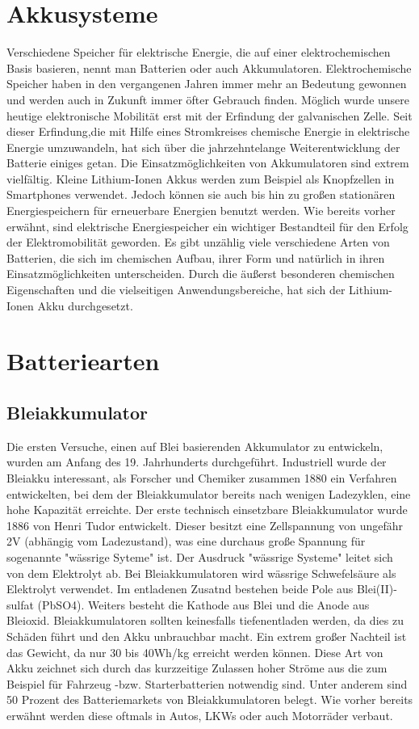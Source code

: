 \section{Akkusysteme}
Verschiedene Speicher für elektrische Energie, die auf einer elektrochemischen Basis basieren, nennt man Batterien oder auch Akkumulatoren. Elektrochemische Speicher haben in den vergangenen Jahren immer mehr an Bedeutung gewonnen und werden auch in Zukunft immer öfter Gebrauch finden. Möglich wurde unsere heutige elektronische Mobilität erst mit der Erfindung der galvanischen Zelle. Seit dieser Erfindung,die mit Hilfe eines Stromkreises chemische Energie in elektrische Energie umzuwandeln, hat sich über die jahrzehntelange Weiterentwicklung der Batterie einiges getan. Die Einsatzmöglichkeiten von Akkumulatoren sind extrem vielfältig. Kleine Lithium-Ionen Akkus werden zum Beispiel als Knopfzellen in Smartphones verwendet. Jedoch können sie auch bis hin zu großen stationären Energiespeichern für erneuerbare Energien benutzt werden. Wie bereits vorher erwähnt, sind elektrische Energiespeicher ein wichtiger Bestandteil für den Erfolg der Elektromobilität geworden. Es gibt unzählig viele verschiedene Arten von Batterien, die sich im chemischen Aufbau, ihrer Form und natürlich in ihren Einsatzmöglichkeiten unterscheiden. Durch die äußerst besonderen chemischen Eigenschaften und die vielseitigen Anwendungsbereiche, hat sich der Lithium-Ionen Akku durchgesetzt.
\newpage

\section{Batteriearten}

\subsection{Bleiakkumulator}
Die ersten Versuche, einen auf Blei basierenden Akkumulator zu entwickeln, wurden am Anfang des 19. Jahrhunderts durchgeführt. Industriell wurde der Bleiakku interessant, als Forscher und Chemiker zusammen 1880 ein Verfahren entwickelten, bei dem der Bleiakkumulator bereits nach wenigen Ladezyklen, eine hohe Kapazität erreichte. Der erste technisch einsetzbare Bleiakkumulator wurde 1886 von Henri Tudor entwickelt. Dieser besitzt eine Zellspannung von ungefähr 2V (abhängig vom Ladezustand), was eine durchaus große Spannung für sogenannte "wässrige Syteme"  ist. Der Ausdruck "wässrige Systeme"  leitet sich von dem Elektrolyt ab. Bei Bleiakkumulatoren wird wässrige Schwefelsäure als Elektrolyt verwendet. Im entladenen Zusatnd bestehen beide Pole aus Blei(II)-sulfat (PbSO4). Weiters besteht die Kathode aus Blei und die Anode aus Bleioxid. Bleiakkumulatoren sollten keinesfalls tiefenentladen werden, da dies zu Schäden führt und den Akku unbrauchbar macht. Ein extrem großer Nachteil ist das Gewicht, da nur 30 bis 40Wh/kg erreicht werden können.
Diese Art von Akku zeichnet sich durch das kurzzeitige Zulassen hoher Ströme aus die zum Beispiel für Fahrzeug -bzw. Starterbatterien notwendig sind. Unter anderem sind 50 Prozent des Batteriemarkets von Bleiakkumulatoren belegt. Wie vorher bereits erwähnt werden diese oftmals in Autos, LKWs oder auch Motorräder verbaut.

